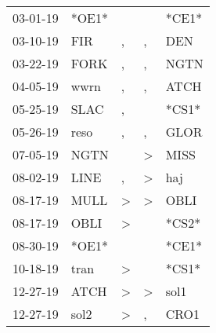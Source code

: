 \begin{supertabular}{p{0.07\textwidth}p{0.06\textwidth}p{0.02\textwidth}p{0.02\textwidth}p{0.06\textwidth}}
          03-01-19\textsuperscript{} &                            *OE1* &                  &                  &                            *CE1* \\
          03-10-19\textsuperscript{} &            FIR\textsuperscript{} &                , &                , &            DEN\textsuperscript{} \\
          03-22-19\textsuperscript{} &           FORK\textsuperscript{} &                , &                , &           NGTN\textsuperscript{} \\
          04-05-19\textsuperscript{} &           wwrn\textsuperscript{} &                , &                , &           ATCH\textsuperscript{} \\
          05-25-19\textsuperscript{} &           SLAC\textsuperscript{} &                , &                  &                            *CS1* \\
          05-26-19\textsuperscript{} &           reso\textsuperscript{} &                , &                , &           GLOR\textsuperscript{} \\
          07-05-19\textsuperscript{} &           NGTN\textsuperscript{} &                  &     \textgreater &           MISS\textsuperscript{} \\
          08-02-19\textsuperscript{} &           LINE\textsuperscript{} &                , &     \textgreater &            haj\textsuperscript{} \\
          08-17-19\textsuperscript{} &           MULL\textsuperscript{} &     \textgreater &     \textgreater &           OBLI\textsuperscript{} \\
          08-17-19\textsuperscript{} &           OBLI\textsuperscript{} &     \textgreater &                  &                            *CS2* \\
          08-30-19\textsuperscript{} &                            *OE1* &                  &                  &                            *CE1* \\
          10-18-19\textsuperscript{} &           tran\textsuperscript{} &     \textgreater &                  &                            *CS1* \\
          12-27-19\textsuperscript{} &           ATCH\textsuperscript{} &     \textgreater &     \textgreater &           sol1\textsuperscript{} \\
          12-27-19\textsuperscript{} &           sol2\textsuperscript{} &     \textgreater &                , &           CRO1\textsuperscript{} \\

\end{supertabular}
